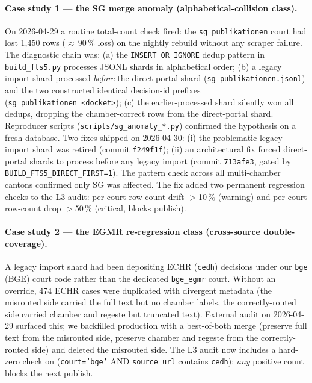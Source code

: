 
\paragraph{Case study 1 --- the SG merge anomaly (alphabetical-collision class).}
On 2026-04-29 a routine total-count check fired: the \texttt{sg\_publikationen}
court had lost 1{,}450 rows ($\approx$\,90\,\% loss) on the nightly rebuild without
any scraper failure. The diagnostic chain was: (a) the \texttt{INSERT OR
IGNORE} dedup pattern in \texttt{build\_fts5.py} processes JSONL shards in
alphabetical order; (b) a legacy import shard processed \emph{before} the
direct portal shard (\texttt{sg\_publikationen.jsonl}) and the two
constructed identical decision-id prefixes
(\texttt{sg\_publikationen\_<docket>}); (c) the earlier-processed shard
silently won all dedups, dropping the chamber-correct rows from the
direct-portal shard.
Reproducer scripts (\texttt{scripts/sg\_anomaly\_*.py}) confirmed the
hypothesis on a fresh database. Two fixes shipped on 2026-04-30: (i) the
problematic legacy import shard was retired (commit
\texttt{f249f1f}); (ii) an architectural fix forced direct-portal shards
to process before any legacy import (commit \texttt{713afe3}, gated by
\texttt{BUILD\_FTS5\_DIRECT\_FIRST=1}). The pattern check across all
multi-chamber cantons confirmed only SG was affected. The fix added two
permanent regression checks to the L3 audit: per-court row-count drift
$>$10\,\% (warning) and per-court row-count drop $>$50\,\% (critical, blocks
publish).

\paragraph{Case study 2 --- the EGMR re-regression class (cross-source double-coverage).}
A legacy import shard had been depositing ECHR (\texttt{cedh})
decisions under our \texttt{bge} (BGE) court code rather than the dedicated
\texttt{bge\_egmr} court. Without an override, 474 ECHR cases were duplicated with
divergent metadata (the misrouted side carried the full text but no chamber labels,
the correctly-routed side carried chamber and regeste but truncated text). External
audit on 2026-04-29 surfaced this; we backfilled production with a
best-of-both merge (preserve full text from the misrouted side, preserve chamber and
regeste from the correctly-routed side) and deleted the misrouted side. The L3 audit now
includes a hard-zero check on (\texttt{court='bge'} AND
\texttt{source\_url} contains \texttt{cedh}): \emph{any} positive count
blocks the next publish.

